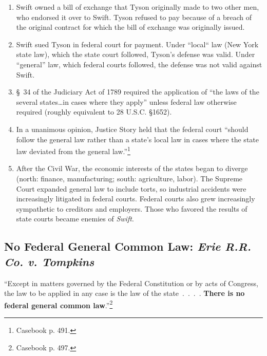 \begin{enumerate}
    \item Swift owned a bill of exchange that Tyson originally made to two 
    other men, who endorsed it over to Swift. Tyson refused to pay because of 
    a breach of the original contract for which the bill of exchange was 
    originally issued.
    \item Swift sued Tyson in federal court for payment. Under 
    ``local`` law (New York state law), which the state court followed, 
    Tyson's defense was valid. Under ``general'' law, which federal courts 
    followed, the defense was not valid against Swift.
    \item \S\ 34 of the Judiciary Act of 1789 required the application of ``the 
    laws of the several states\ldots in cases where they apply'' unless 
    federal law otherwise required (roughly equivalent to 28 U.S.C. \S 1652).
    \item In a unanimous opinion, Justice Story held that the federal court 
    ``should follow the general law rather than a state's local law in cases 
    where the state law deviated from the general law.''\footnote{Casebook p. 
    491.}
    \item After the Civil War, the economic interests of the states began to 
    diverge (north: finance, manufacturing; south: agriculture, labor). The 
    Supreme Court expanded general law to include torts, so industrial 
    accidents were increasingly litigated in federal courts. Federal courts 
    also grew increasingly sympathetic to creditors and employers. Those who 
    favored the results of state courts became enemies of \emph{Swift}.
\end{enumerate}

\subsection{No Federal General Common Law: \emph{Erie R.R. Co. v. Tompkins}}

``Except in matters governed by the Federal Constitution or by acts of 
Congress, the law to be applied in any case is the law of the state~.~.~.~.  
\textbf{There is no federal general common law}.''\footnote{Casebook p. 497.}


